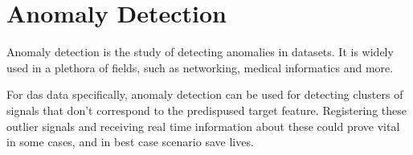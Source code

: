 \section{Anomaly Detection}

Anomaly detection is the study of detecting anomalies in datasets. It is widely used in a plethora of fields, such as networking, medical informatics and more. 

For \acrshort{das} data specifically, anomaly detection can be used for detecting clusters of signals that don't correspond to the predispused target feature. Registering these outlier signals and receiving real time information about these could prove vital in some cases,  and in best case scenario save lives.